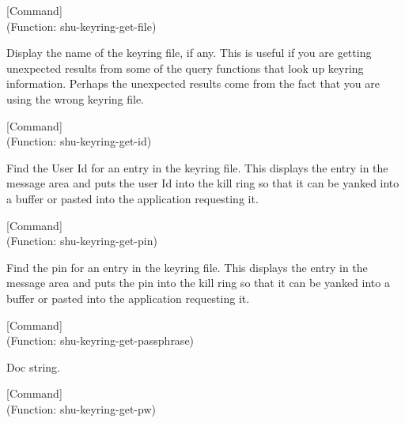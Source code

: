 \vspace{1em}
\noindent
{}
\usebox{\funcname}
 \hfill [Command]\\%
 (Function: shu-keyring-get-file)

\begin{doc-string}
Display the name of the keyring file, if any.  This is useful if you are
getting unexpected results from some of the query functions that look up keyring
information.  Perhaps the unexpected results come from the fact that you are
using the wrong keyring file.
\end{doc-string}

\vspace{1em}
\noindent
{}
\usebox{\funcname}
 \hfill [Command]\\%
 (Function: shu-keyring-get-id)

\begin{doc-string}
Find the User Id for an entry in the keyring file.  This displays the entry
in the message area and puts the user Id into the kill ring so that it can be
yanked into a buffer or pasted into the application requesting it.
\end{doc-string}

\vspace{1em}
\noindent
{}
\usebox{\funcname}
 \hfill [Command]\\%
 (Function: shu-keyring-get-pin)

\begin{doc-string}
Find the pin for an entry in the keyring file.  This displays the entry in
the message area and puts the pin into the kill ring so that it can be yanked
into a buffer or pasted into the application requesting it.
\end{doc-string}

\vspace{1em}
\noindent
{}
\usebox{\funcname}
 \hfill [Command]\\%
 (Function: shu-keyring-get-passphrase)

\begin{doc-string}
Doc string.
\end{doc-string}

\vspace{1em}
\noindent
{}
\usebox{\funcname}
 \hfill [Command]\\%
 (Function: shu-keyring-get-pw)

